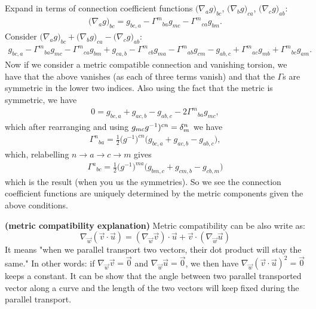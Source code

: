 \documentclass[12pt]{article} %
\newcommand{\bfs}[1]{\textbf{({#1}) }}
\begin{document}
\bq 

 Expand in terms of connection coefficient functions 
 $\big(\nabla_ag\big)_{bc}$, 
    $\big(\nabla_bg\big)_{ca}$,
 $\big(\nabla_cg\big)_{ab}$:
\begin{align*} 
    \big(\nabla_ag\big)_{bc} = g_{bc,a} - {\Gamma^m}_{ba}g_{mc} - {\Gamma^m}_{ca}g_{bm}. 
\end{align*}
Consider $\big(\nabla_ag\big)_{bc}+\big(\nabla_bg\big)_{ca}-\big(\nabla_cg\big)_{ab}$:
\begin{align*} 
    g_{bc,a} - {\Gamma^m}_{ba}g_{mc} - {\Gamma^m}_{ca}g_{bm} + g_{ca,b} - {\Gamma^m}_{cb}g_{ma} - {\Gamma^m}_{ab}g_{cm} - g_{ab,c} + {\Gamma^m}_{ac}g_{mb} + {\Gamma^m}_{bc}g_{am}.
\end{align*} 
Now if we consider a metric compatible connection and vanishing torsion, we have that the above vanishes (as each of three terms vanish) and that the $\Gamma$s are symmetric in the lower two indices. Also using the fact that the metric is symmetric, we have 
\begin{align*} 
    0 = g_{bc,a} + g_{ac,b} - g_{ab,c} - 2{\Gamma^m}_{ba}g_{mc},
\end{align*} 
which after rearranging and using $g_{mc}g^{-1})^{cn} = \delta^n_m$ we have 
\begin{align*} 
    {\Gamma^n}_{ba} = \frac{1}{2}\big(g^{-1}\big)^{cn}\big(g_{bc,a} + g_{ac,b} - g_{ab,c}\big),
\end{align*} 
which, relabelling $n\to a \to c \to m$ gives
\begin{align*} 
    {\Gamma^a}_{bc} = \frac{1}{2}\big(g^{-1}\big)^{ma}\big(g_{bm,c} + g_{cm,b} - g_{cb,m}\big)
\end{align*} 
which is the result (when you us the symmetries). So we see the connection coefficient functions are uniquely determined by the metric components given the above conditions. 
\eq 
\begin{rema}\bfs{metric compatibility explanation}
Metric compatibility can be also write as:
$$
\nabla_{\vec{w}}(\vec{v} \cdot \vec{u})=\left(\nabla_{\vec{w}} \vec{v}\right) \cdot \vec{u}+\vec{v} \cdot\left(\nabla_{\vec{w}} \vec{u}\right)
$$
It means "when we parallel transport two vectors, their dot product will stay the same." In other words: if  $\nabla_{\vec{w}} \vec{v}=\overrightarrow{0}$ and  $\nabla_{\vec{w}} \vec{u}=\overrightarrow{0}$, we then have $\nabla_{\vec{w}}(\vec{v} \cdot \vec{u})^{2}=\overrightarrow{0}$ keeps a constant. It can be show that the angle between two parallel transported vector along a curve  and the length of the two vectors will keep fixed during the  parallel transport.
\end{rema}
\end{document}
